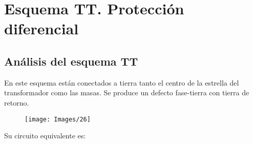\chapter{Esquema TT. Protección diferencial}
\section{Análisis del esquema TT}
En este esquema están conectados a tierra tanto el centro de la estrella del transformador como las masas. Se produce un defecto fase-tierra con tierra de retorno.
\begin{figure}[H]
	\centering
	\texttt{[image: Images/26]}
	\label{fig:26}
\end{figure}

Su circuito equivalente es:
\begin{figure}[H]
	\centering
	\begin{adjustbox}{width=1\textwidth}
	

\end{adjustbox}
\end{figure}
